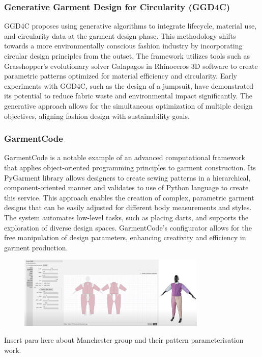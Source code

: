 \subsubsection{Generative Garment Design for Circularity (GGD4C)}
GGD4C proposes using generative algorithms to integrate lifecycle, material use, and circularity data at the garment design phase. This methodology shifts towards a more environmentally conscious fashion industry by incorporating circular design principles from the outset. The framework utilizes tools such as Grasshopper’s evolutionary solver Galapagos in Rhinoceros 3D software to create parametric patterns optimized for material efficiency and circularity. Early experiments with GGD4C, such as the design of a jumpsuit, have demonstrated its potential to reduce fabric waste and environmental impact significantly. The generative approach allows for the simultaneous optimization of multiple design objectives, aligning fashion design with sustainability goals.

\subsubsection{GarmentCode}
GarmentCode is a notable example of an advanced computational framework that applies object-oriented programming principles to garment construction. Its PyGarment library allows designers to create sewing patterns in a hierarchical, component-oriented manner and validates to use of Python language to create this service. This approach enables the creation of complex, parametric garment designs that can be easily adjusted for different body measurements and styles. The system automates low-level tasks, such as placing darts, and supports the exploration of diverse design spaces. GarmentCode's configurator allows for the free manipulation of design parameters, enhancing creativity and efficiency in garment production.
\begin{figure} [H]
    \centering
    \includegraphics[width=0.8\textwidth]{Images/pygarment.png}
\end{figure}

Insert para here about Manchester group and their pattern parameterisation work.


